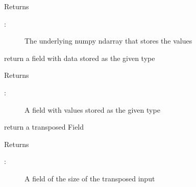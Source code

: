 \documentclass[letterpaper,10pt,english]{sphinxmanual}
\begin{document}
\begin{fulllineitems}
\begin{fulllineitems}
\sphinxAtStartPar
Returns
\begin{description}
\item[{:}] \leavevmode
\sphinxAtStartPar
The underlying numpy ndarray that stores the values

\end{description}

\end{fulllineitems}


\begin{fulllineitems}
\label{\detokenize{autoapi/Field/index:Field.Field.astype}}
\sphinxAtStartPar
return a field with data stored as the given type

\sphinxAtStartPar
Returns
\begin{description}
\item[{:}] \leavevmode
\sphinxAtStartPar
A field with values stored as the given type

\end{description}

\end{fulllineitems}


\begin{fulllineitems}
\label{\detokenize{autoapi/Field/index:Field.Field.T}}
\sphinxAtStartPar
return a transposed Field

\sphinxAtStartPar
Returns
\begin{description}
\item[{:}] \leavevmode
\sphinxAtStartPar
A field of the size of the transposed input

\end{description}

\end{fulllineitems}


\begin{fulllineitems}
\label{\detokenize{autoapi/Field/index:Field.Field.__getitem__}}
\end{fulllineitems}


\end{fulllineitems}
\end{document}
